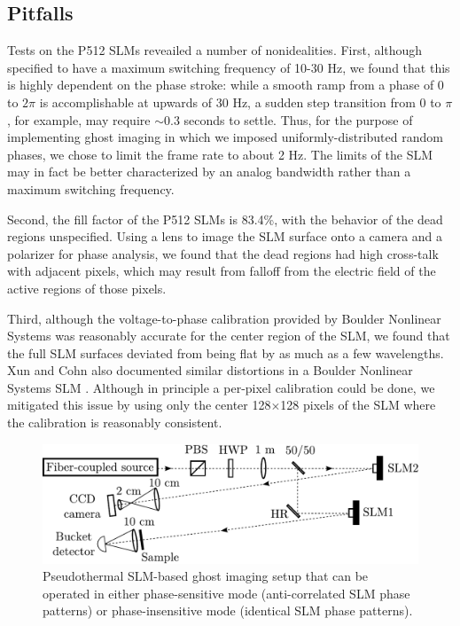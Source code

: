 \subsection{Pitfalls}
\label{subsection:pitfalls}
Tests on the P512 SLMs reveailed a number of nonidealities. First, although specified to have a maximum switching frequency of 10-30 Hz, we found that this is highly dependent on the phase stroke: while a smooth ramp from a phase of $0$ to $2\pi$ is accomplishable at upwards of 30 Hz, a sudden step transition from $0$ to $\pi$, for example, may require $\sim 0.3$ seconds to settle. Thus, for the purpose of implementing ghost imaging in which we imposed uniformly-distributed random phases, we chose to limit the frame rate to about 2 Hz. The limits of the SLM may in fact be better characterized by an analog bandwidth rather than a maximum switching frequency.

Second, the fill factor of the P512 SLMs is 83.4\%, with the behavior of the dead regions unspecified. Using a lens to image the SLM surface onto a camera and a polarizer for phase analysis, we found that the dead regions had high cross-talk with adjacent pixels, which may result from falloff from the electric field of the active regions of those pixels.

Third, although the voltage-to-phase calibration provided by Boulder Nonlinear Systems was reasonably accurate for the center region of the SLM, we found that the full SLM surfaces deviated from being flat by as much as a few wavelengths. Xun and Cohn also documented similar distortions in a Boulder Nonlinear Systems SLM \cite{xun-phase}. Although in principle a per-pixel calibration could be done, we mitigated this issue by using only the center 128$\times$128 pixels of the SLM where the calibration is reasonably consistent.

\begin{figure}[t]
\begin{center}
\includegraphics[width=13cm]{figure-ghost-setup.pdf}
\caption{Pseudothermal SLM-based ghost imaging setup that can be operated in either phase-sensitive mode (anti-correlated SLM phase patterns) or phase-insensitive mode (identical SLM phase patterns).}
\label{figure:ghost-setup}
\end{center}
\end{figure}


